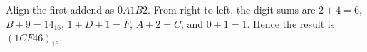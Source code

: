 Align the first addend as $0A1B2$. From right to left, the digit sums are $2+4=6$, $B+9=14_{16}$, $1+D+1=F$, $A+2=C$, and $0+1=1$. Hence the result is $\boxed{(1CF46)_{16}}$.
